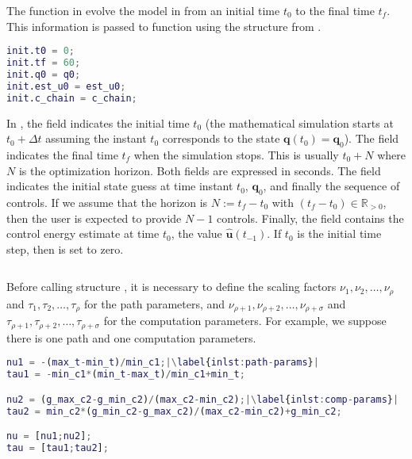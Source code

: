 The function  in  evolve the model in  from an initial time $t_0$ to the final time $t_f$. This information is passed to function using the structure  from .

\begin{lstlisting}[language=Matlab,caption={[Structure \stt{init} with numerical integrator's initializations]Structure \stt{init} with numerical integrator's initializations.},captionpos=b,label=lst:init]
init.t0 = 0;
init.tf = 60;
init.q0 = q0;
init.est_u0 = est_u0;
init.c_chain = c_chain;
\end{lstlisting}

In , the field  indicates the initial time $t_0$ (the mathematical simulation starts at $t_0+\Delta t$ assuming the instant $t_0$ corresponds to the state $\mathbf{q}(t_0)=\mathbf{q}_0$). The field  indicates the final time $t_f$ when the simulation stops. This is usually $t_0+N$ where $N$ is the optimization horizon. Both fields are expressed in seconds. The field  indicates the initial state guess at time instant $t_0$, $\mathbf{q}_0$, and finally  the sequence of controls. If we assume that the horizon is $N:=t_f-t_0$ with $(t_f-t_0)\in\mathbb{R}_{>0}$, then the user is expected to provide $N-1$ controls. Finally, the field  contains the control energy estimate at time $t_0$, the value $\hat{\mathbf{u}}(t_{-1})$. If $t_0$ is the initial time step, then  is set to zero.  

\begin{lstlisting}[language=Matlab,caption={Runge-Kutta fourth order method for numerical integration of the model.},captionpos=b,label=lst:rk4]
% TODO
\end{lstlisting}

Before calling structure , it is necessary to define the scaling factors $\nu_1,\nu_2,\dots,\nu_{\rho}$ and $\tau_1,\tau_2,\dots,\tau_{\rho}$ for the path parameters, and $\nu_{\rho+1},\nu_{\rho+2},\dots,\nu_{\rho+\sigma}$ and $\tau_{\rho+1},\tau_{\rho+2},\dots,\tau_{\rho+\sigma}$ for the computation parameters. For example, we suppose there is one path and one computation parameters. 

\begin{lstlisting}[language=Matlab,caption={[Implementation of path and computation parameters scaling factors]Implementation of path and computation parameters scaling factors.},captionpos=b,label=lst:nu_tau,escapechar=|]
nu1 = -(max_t-min_t)/min_c1;|\label{inlst:path-params}|
tau1 = -min_c1*(min_t-max_t)/min_c1+min_t;

nu2 = (g_max_c2-g_min_c2)/(max_c2-min_c2);|\label{inlst:comp-params}|
tau2 = min_c2*(g_min_c2-g_max_c2)/(max_c2-min_c2)+g_min_c2;

nu = [nu1;nu2];
tau = [tau1;tau2];
\end{lstlisting}

